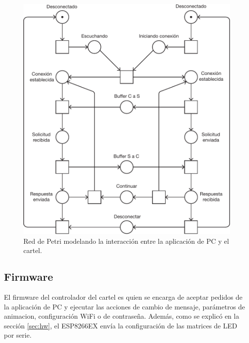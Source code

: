 \begin{figure}[htbp]
	\centering
	\includegraphics[width=\linewidth]{imagenes/petri-net.pdf}
	\caption{Red de Petri modelando la interacción entre la aplicación de PC y el cartel.}
	\label{fig:petri-net}
\end{figure}

\subsection{Firmware}
El firmware del controlador del cartel es quien se encarga de aceptar pedidos de la aplicación de PC y ejecutar las acciones de cambio de mensaje, parámetros de animacion, configuración WiFi o de contraseña. Además, como se explicó en la sección \ref{sec:hw}, el ESP8266EX envía la configuración de las matrices de LED por serie.




